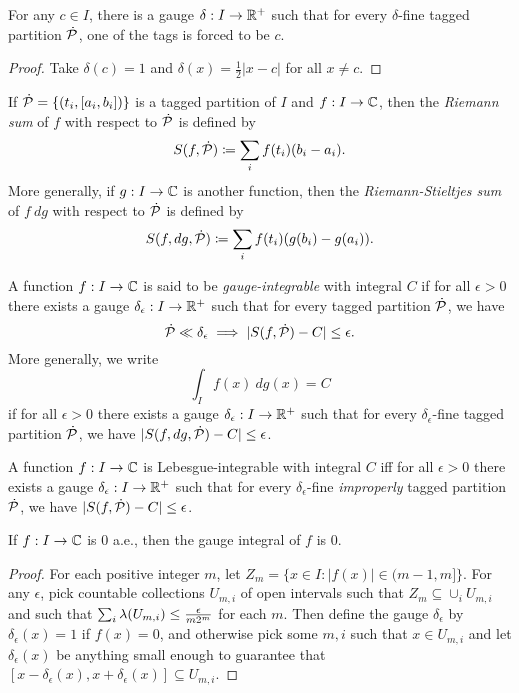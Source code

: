 \begin{prop} For any $c \in I$, there is a gauge $\delta : I \rightarrow \mathbb{R}^+$ such that for every $\delta$-fine tagged partition $\dot{\mathcal{P}}$, one of the tags is forced to be $c$.
\end{prop}
\begin{proof} Take $\delta(c) = 1$ and $\delta(x) = \frac{1}{2}|x-c|$ for all $x \ne c$.
\end{proof}

\begin{defn} If $\dot{\mathcal{P}} = \{(t_i,[a_i,b_i])\}$ is a tagged partition of $I$ and $f : I \rightarrow \mathbb{C}$, then the \emph{Riemann sum} of $f$ with respect to $\dot{\mathcal{P}}$ is defined by
\[
S(f, \dot{\mathcal{P}}) \coloneqq \sum_i f(t_i)(b_i - a_i).
\]
More generally, if $g : I \rightarrow \mathbb{C}$ is another function, then the \emph{Riemann-Stieltjes sum} of $f\ dg$ with respect to $\dot{\mathcal{P}}$ is defined by
\[
S(f, dg, \dot{\mathcal{P}}) \coloneqq \sum_i f(t_i)(g(b_i) - g(a_i)).
\]
\end{defn}

\begin{defn} A function $f : I \rightarrow \mathbb{C}$ is said to be \emph{gauge-integrable} with integral $C$ if for all $\epsilon > 0$ there exists a gauge $\delta_\epsilon : I \rightarrow \mathbb{R}^+$ such that for every tagged partition $\dot{\mathcal{P}}$, we have
\[
\dot{\mathcal{P}} \ll \delta_\epsilon \implies |S(f,\dot{\mathcal{P}}) - C| \le \epsilon.
\]
More generally, we write
\[
\int_I f(x)\ dg(x) = C
\]
if for all $\epsilon > 0$ there exists a gauge $\delta_\epsilon : I \rightarrow \mathbb{R}^+$ such that for every $\delta_\epsilon$-fine tagged partition $\dot{\mathcal{P}}$, we have $|S(f, dg, \dot{\mathcal{P}}) - C| \le \epsilon$.
\end{defn}

\begin{thm} A function $f : I \rightarrow \mathbb{C}$ is Lebesgue-integrable with integral $C$ iff for all $\epsilon > 0$ there exists a gauge $\delta_\epsilon : I \rightarrow \mathbb{R}^+$ such that for every $\delta_\epsilon$-fine \emph{improperly} tagged partition $\dot{\mathcal{P}}$, we have $|S(f,\dot{\mathcal{P}}) - C| \le \epsilon$.
\end{thm}

\begin{prop} If $f : I \rightarrow \mathbb{C}$ is $0$ a.e., then the gauge integral of $f$ is $0$.
\end{prop}
\begin{proof} For each positive integer $m$, let $Z_m = \{x \in I : |f(x)| \in (m-1,m]\}$. For any $\epsilon$, pick countable collections $U_{m,i}$ of open intervals such that $Z_m \subseteq \cup_i U_{m,i}$ and such that $\sum_i \lambda(U_{m,i}) \le \frac{\epsilon}{m2^m}$ for each $m$. Then define the gauge $\delta_\epsilon$ by $\delta_\epsilon(x) = 1$ if $f(x) = 0$, and otherwise pick some $m,i$ such that $x \in U_{m,i}$ and let $\delta_\epsilon(x)$ be anything small enough to guarantee that $[x-\delta_\epsilon(x), x+\delta_\epsilon(x)] \subseteq U_{m,i}$.
\end{proof}

